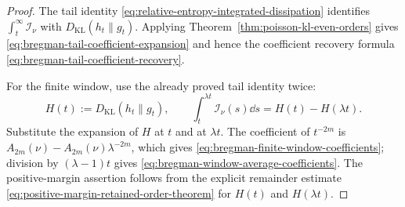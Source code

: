 \begin{proof}
The tail identity \eqref{eq:relative-entropy-integrated-dissipation} identifies
\(\int_t^\infty \mathcal I_\nu\) with \(D_{\mathrm{KL}}(h_t\|g_t)\).  Applying
Theorem~\ref{thm:poisson-kl-even-orders} gives
\eqref{eq:bregman-tail-coefficient-expansion} and hence the coefficient
recovery formula \eqref{eq:bregman-tail-coefficient-recovery}.

For the finite window, use the already proved tail identity twice:
\[
H(t):=D_{\mathrm{KL}}(h_t\|g_t),
\qquad
\int_t^{\lambda t}\mathcal I_\nu(s)\dd s=H(t)-H(\lambda t).
\]
Substitute the expansion of \(H\) at \(t\) and at \(\lambda t\).  The
coefficient of \(t^{-2m}\) is
\(A_{2m}(\nu)-A_{2m}(\nu)\lambda^{-2m}\), which gives
\eqref{eq:bregman-finite-window-coefficients}; division by
\((\lambda-1)t\) gives \eqref{eq:bregman-window-average-coefficients}.
The positive-margin assertion follows from the explicit remainder estimate
\eqref{eq:positive-margin-retained-order-theorem} for \(H(t)\) and
\(H(\lambda t)\).
\end{proof}
